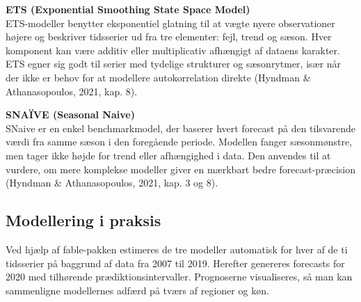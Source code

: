 \documentclass[
]{article}
\begin{document}
\textbf{ETS (Exponential Smoothing State Space Model)}\\
ETS-modeller benytter eksponentiel glatning til at vægte nyere
observationer højere og beskriver tidsserier ud fra tre elementer: fejl,
trend og sæson. Hver komponent kan være additiv eller multiplicativ
afhængigt af dataens karakter. ETS egner sig godt til serier med
tydelige strukturer og sæsonrytmer, især når der ikke er behov for at
modellere autokorrelation direkte (Hyndman \& Athanasopoulos, 2021, kap.
8).

\textbf{SNAÏVE (Seasonal Naive)}\\
SNaive er en enkel benchmarkmodel, der baserer hvert forecast på den
tilsvarende værdi fra samme sæson i den foregående periode. Modellen
fanger sæsonmønstre, men tager ikke højde for trend eller afhængighed i
data. Den anvendes til at vurdere, om mere komplekse modeller giver en
mærkbart bedre forecast-præcision (Hyndman \& Athanasopoulos, 2021, kap.
3 og 8).

\subsection{Modellering i praksis}\label{modellering-i-praksis}

Ved hjælp af fable-pakken estimeres de tre modeller automatisk for hver
af de ti tidsserier på baggrund af data fra 2007 til 2019. Herefter
genereres forecasts for 2020 med tilhørende prædiktionsintervaller.
Prognoserne visualiseres, så man kan sammenligne modellernes adfærd på
tværs af regioner og køn.
\end{document}
